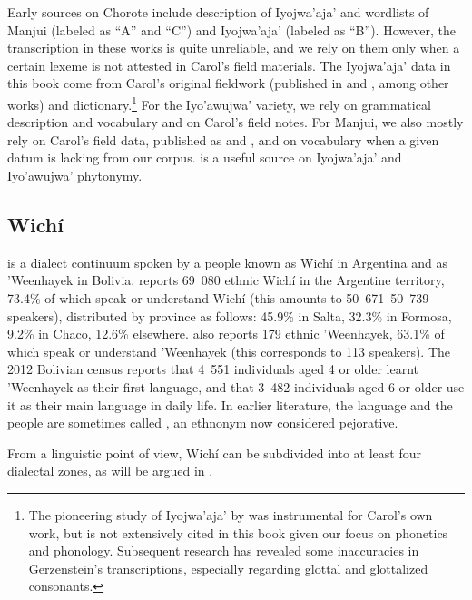 Early sources on Chorote include  description of Iyojwa’aja’ and  wordlists of Manjui (labeled as ``A'' and ``C'') and Iyojwa’aja’ (labeled as ``B''). However, the transcription in these works is quite unreliable, and we rely on them only when a certain lexeme is not attested in Carol's field materials. The Iyojwa’aja’ data in this book come from Carol's original fieldwork (published in  and , among other works) and  dictionary.\footnote{The pioneering study of Iyojwa’aja’ by \citet{AG78,AG79} was instrumental for Carol’s own work, but is not extensively cited in this book given our focus on phonetics and phonology. Subsequent research has revealed some inaccuracies in Gerzenstein’s transcriptions, especially regarding glottal and glottalized consonants.} For the Iyo’awujwa’ variety, we rely on  grammatical description and vocabulary and on Carol's field notes. For Manjui, we also mostly rely on Carol's field data, published as \citet{JC18} and \citet{JC-amer}, and on  vocabulary when a given datum is lacking from our corpus. \citet{GS10} is a useful source on Iyojwa’aja’ and Iyo’awujwa’ phytonymy.

\subsection{Wichí} \label{intro-wi}
 is a dialect continuum spoken by a people known as Wichí in Argentina and as ’Weenhayek in Bolivia. \citet{indec2024} reports 69~080 ethnic Wichí in the Argentine territory, 73.4\% of which speak or understand Wichí (this amounts to 50~671–50~739 speakers), distributed by province as follows: 45.9\% in Salta, 32.3\% in Formosa, 9.2\% in Chaco, 12.6\% elsewhere. \citet{indec2024} also reports 179 ethnic ’Weenhayek, 63.1\% of which speak or understand ’Weenhayek (this corresponds to 113 speakers). The 2012 Bolivian census \citep{ine-bo-12} reports that 4~551 individuals aged 4 or older learnt 'Weenhayek as their first language, and that 3~482 individuals aged 6 or older use it as their main language in daily life. In earlier literature, the language and the people are sometimes called , an ethnonym now considered pejorative.

From a linguistic point of view, Wichí can be subdivided into at least four dialectal zones, as will be argued in .


